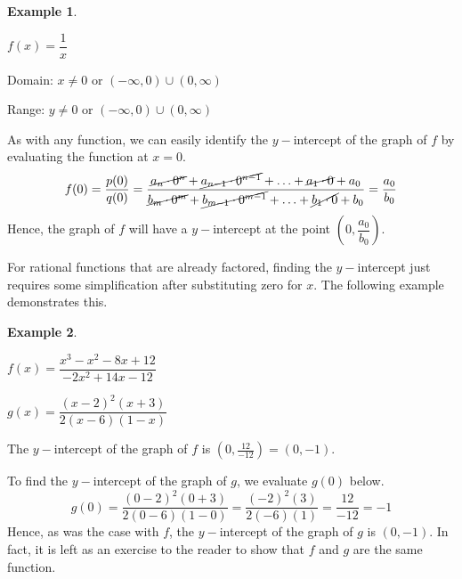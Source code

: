 \documentclass[12pt]{book}
\theoremstyle{definition}
\newtheorem{example}{Example}
\begin{document}
\begin{example}
\begin{multicols}{2}
$f(x)=\dfrac{1}{x}$
\par
Domain: $x\neq 0$ or $(-\infty,0)\cup(0,\infty)$
\par
Range: $y\neq 0$ or $(-\infty,0)\cup(0,\infty)$
\par
\columnbreak
{}
\end{multicols}
\end{example}
As with any function, we can easily identify the $y-$intercept of the graph of $f$ by evaluating the function at $x=0$.
$$f(0)=\frac{p(0)}{q(0)}=\frac{\cancel{a_n\cdot0^n}+\cancel{a_{n-1}\cdot0^{n-1}}+\ldots+\cancel{a_1\cdot0}+a_0}{\cancel{b_m\cdot0^m}+\cancel{b_{m-1}\cdot0^{m-1}}+\ldots+\cancel{b_1\cdot0}+b_0}=\frac{a_0}{b_0}$$
Hence, the graph of $f$ will have a $y-$intercept at the point $\left(0,\dfrac{a_0}{b_0}\right)$.\par
For rational functions that are already factored, finding the $y-$intercept just requires some simplification after substituting zero for $x$.  The following example demonstrates this.
\begin{example}
\begin{multicols}{2}
$f(x)=\dfrac{x^3-x^2-8x+12}{-2x^2+14x-12}$
\par
$g(x)=\dfrac{(x-2)^2(x+3)}{2(x-6)(1-x)}$
\end{multicols}
The $y-$intercept of the graph of $f$ is $(0,\frac{12}{-12})=(0,-1)$.
\par
To find the $y-$intercept of the graph of $g$, we evaluate $g(0)$ below.
$$g(0)=\dfrac{(0-2)^2(0+3)}{2(0-6)(1-0)}=\dfrac{(-2)^2(3)}{2(-6)(1)}=\dfrac{12}{-12}=-1$$
Hence, as was the case with $f$, the $y-$intercept of the graph of $g$ is $(0,-1)$.  In fact, it is left as an exercise to the reader to show that $f$ and $g$ are the same function.
\end{example}
\end{document}

